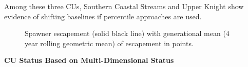 \documentclass[11pt]{book}
\begin{document}
Among these three CUs, Southern Coastal Streams and Upper Knight show evidence of shifting baselines if percentile approaches are used.
\begin{figure}[htb]

{\centering {} 

}

\caption{Spawner escapement (solid black line) with generational mean (4 year rolling geometric mean) of escapement in points.}\label{fig:chum-perc-status-static}
\end{figure}
\textbf{CU Status Based on Multi-Dimensional Status}
\end{document}
